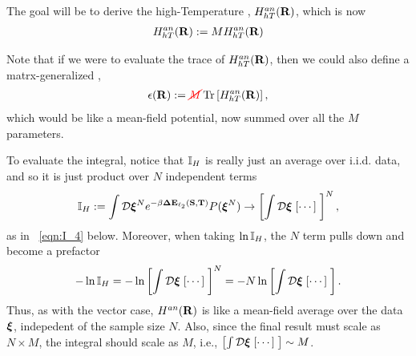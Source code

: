 The goal will be to derive the high-Temperature \AnnealedHamiltonian, $H^{an}_{hT}(\mathbf{R})$, which is now
\begin{align}
 \label{eqn:hanpp}
  H^{an}_{hT}(\mathbf{R}):=MH^{an}_{hT}(\mathbf{R})
\end{align}

Note that if we were to evaluate the trace of $H^{an}_{hT}(\mathbf{R})$, then we could also define
a matrx-generalized \EffectivePotential,
\begin{align}
  \label{eqn:EPSL_mat}
  \epsilon(\mathbf{R}):={\color{red}\sf{\cancel{M}}}\mbox{}\operatorname{Tr}\left[H^{an}_{hT}(\mathbf{R})\right],
\end{align}
which would be like a mean-field potential, now summed over all the $M$ parameters.


To evaluate the integral, notice that $\mathbb{I}_{H}$ is really just an average over i.i.d. data, and so it is just product over $N$ independent terms
\begin{align}
\mathbb{I}_{H} := \int\mathcal{D}\boldsymbol{\xi}^{N}  e^{-\beta \mathbf{\Delta {E}}_{\ell_2}({\mathbf{S}},{\mathbf{T}})} P(\boldsymbol{\xi}^{N})  \rightarrow\left[\int\mathcal{D}\boldsymbol{\xi} \;[\cdots]\; \right]^{N} ,
\end{align}
as in \EQN~\ref{eqn:I_4} below.
Moreover, when taking $\ln \mathbb{I}_{H}$, the $N$ term pulls down and become a prefactor
\begin{align}
-\ln \mathbb{I}_{H} = -\ln\left[\int\mathcal{D}\boldsymbol{\xi} \;[\cdots]\; \right]^{N}= -N\ln\left[\int\mathcal{D}\boldsymbol{\xi} \;[\cdots]\; \right] .
\end{align}
Thus, as with the vector case, $H^{an}(\mathbf{R})$ is like a mean-field average over the data $\boldsymbol{\xi}$, indepedent of the sample size $N$.
Also, since the final result must scale as $N\times M$, the integral should scale as $M$, i.e.,
$\left[\int\mathcal{D}\boldsymbol{\xi} \;[\cdots]\; \right]\sim M$.


